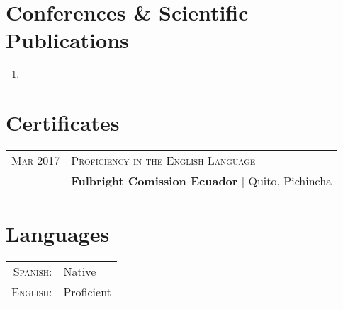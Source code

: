 \documentclass[a4paper,10.9pt]{article}
\begin{document}
\begin{tabular}{r|p{11cm}}
\\

\end{tabular}

\section{Conferences \& Scientific Publications}
\begin{enumerate}
	\item {}
\end{enumerate}

\section{Certificates}
\begin{tabular}{r|l}	
 \textsc{Mar} 2017 &  \textsc{Proficiency in the English Language}\\&
 \textbf{Fulbright Comission Ecuador} | Quito, Pichincha\\

\end{tabular}

\section{Languages}
\begin{tabular}{rl}
 \textsc{Spanish:}&Native\\
\textsc{English:}&Proficient\\
\end{tabular}
\end{document}

